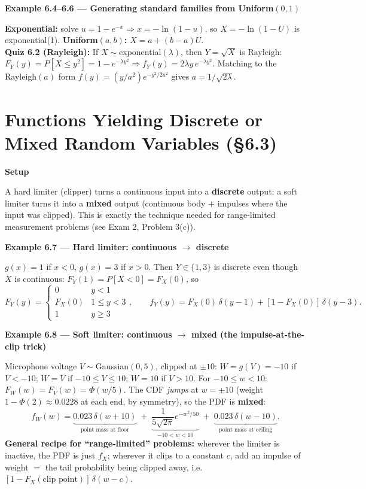 \documentclass[11pt]{article}
\renewcommand{\P}[1]{P\left[#1\right]}
\newcommand{\topline}[1]{\par\vspace{5pt}\noindent{\color{#1}\rule{\linewidth}{1.1pt}}\par\vspace{3pt}}
\newcommand{\botline}[1]{\par\vspace{2pt}\noindent{\color{#1}\rule{\linewidth}{1.1pt}}\par\vspace{8pt}}
\newenvironment{exbox}[2]{%
  \topline{exmcol}\noindent\textbf{\color{exmcol}Example #1 --- #2}\par\smallskip\noindent\ignorespaces
}{\botline{exmcol}}
\newenvironment{notebox}[1]{%
  \topline{notecol}\noindent\textbf{\color{notecol}#1}\par\smallskip\noindent\ignorespaces
}{\botline{notecol}}
\begin{document}
\begin{exbox}{6.4--6.6}{Generating standard families from Uniform$(0,1)$}
\textbf{Exponential:} solve $u=1-e^{-x}\Rightarrow x=-\ln(1-u)$, so $X=-\ln(1-U)$ is
exponential(1). \textbf{Uniform$(a,b)$:} $X=a+(b-a)U$.\\[4pt]
\textbf{Quiz 6.2 (Rayleigh):} If $X\sim$exponential$(\lambda)$, then $Y=\sqrt X$ is Rayleigh:
$F_Y(y)=\P{X\le y^2}=1-e^{-\lambda y^2}\Rightarrow f_Y(y)=2\lambda y\,e^{-\lambda y^2}$.
Matching to the Rayleigh$(a)$ form $f(y)=(y/a^2)e^{-y^2/2a^2}$ gives $\boxed{a=1/\sqrt{2\lambda}}$.
\end{exbox}

\clearpage
\section{Functions Yielding Discrete or Mixed Random Variables (\S6.3)}
\label{sec:63}

\begin{notebox}{Setup}
A hard limiter (clipper) turns a continuous input into a \textbf{discrete} output; a soft
limiter turns it into a \textbf{mixed} output (continuous body $+$ impulses where the input was
clipped). This is exactly the technique needed for range-limited measurement problems (see
Exam 2, Problem 3(c)).
\end{notebox}

\begin{exbox}{6.7}{Hard limiter: continuous $\to$ discrete}
$g(x)=1$ if $x<0$, $g(x)=3$ if $x>0$. Then $Y\in\{1,3\}$ is discrete even though $X$ is
continuous: $F_Y(1)=\P{X<0}=F_X(0)$, so
\[ F_Y(y)=\begin{cases}0 & y<1\\ F_X(0) & 1\le y<3\\ 1 & y\ge3\end{cases}, \qquad
f_Y(y) = F_X(0)\,\delta(y-1) + [1-F_X(0)]\,\delta(y-3). \]
\end{exbox}

\begin{exbox}{6.8}{Soft limiter: continuous $\to$ \textbf{mixed} (the impulse-at-the-clip trick)}
Microphone voltage $V\sim$Gaussian$(0,5)$, clipped at $\pm10$: $W=g(V)=-10$ if $V<-10$; $W=V$
if $-10\le V\le10$; $W=10$ if $V>10$. For $-10\le w<10$: $F_W(w)=F_V(w)=\Phi(w/5)$. The CDF
\emph{jumps} at $w=\pm10$ (weight $1-\Phi(2)\approx0.0228$ at each end, by symmetry), so the
PDF is \textbf{mixed}:
\[
f_W(w) = \underbrace{0.023\,\delta(w+10)}_{\text{point mass at floor}} \;+\; \underbrace{\frac{1}{5\sqrt{2\pi}}e^{-w^2/50}}_{-10<w<10} \;+\; \underbrace{0.023\,\delta(w-10)}_{\text{point mass at ceiling}}.
\]
\textbf{General recipe for ``range-limited'' problems:} wherever the limiter is inactive, the
PDF is just $f_X$; wherever it clips to a constant $c$, add an impulse of weight $=$ the
tail probability being clipped away, i.e.\ $[1-F_X(\text{clip point})]\,\delta(w-c)$.
\end{exbox}
\end{document}
